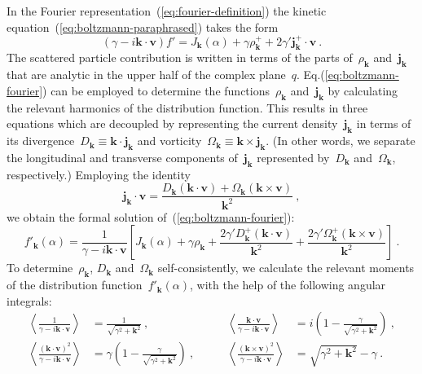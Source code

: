 \documentclass[preprint,aps,eqsecnum, prb]{revtex4-1}
\newcommand{\fplus}[1]{{#1}^{+}}
\begin{document}
In the Fourier representation~(\ref{eq:fourier-definition}) the kinetic
equation~(\ref{eq:boltzmann-paraphrased}) takes the form
\begin{equation}
  \label{eq:boltzmann-fourier}
  (\gamma - i {\bm k} \cdot {\bm v}) f' = J_{\bm k}(\alpha)
    +   \gamma \fplus{\rho}_{\bm k}
    + 2 \gamma' \fplus{\bm j}_{\bm k} \cdot {\bm v}
\ .
\end{equation}
The scattered particle contribution is written in terms of
the parts of~$\rho_{\bm k}$ and~${\bm j}_{\bm k}$ that are analytic in the
upper half of the complex plane~$q$. Eq.(\ref{eq:boltzmann-fourier})
can be employed to determine
the functions~$\rho_{\bm k}$ and~${\bm j}_{\bm k}$ by calculating the
relevant harmonics of the distribution function. This results in three
equations which are decoupled by representing the
current density~${\bm j}_{\bm k}$ in terms of its
divergence~$D_{\bm k} \equiv {\bm k}\cdot{\bm j}_{\bm k}$
and vorticity~$\Omega_{\bm k} \equiv {\bm k} \times {\bm j}_{\bm k}$.
(In other words, we separate the longitudinal and transverse
components of~${\bm j}_{\bm k}$ represented by~$D_{\bm k}$
and~$\Omega_{\bm k}$, respectively.)
Employing the identity
\begin{equation}
  \label{eq:current-identity}
  {\bm j}_{\bm k} \cdot {\bm v} = \frac{D_{\bm k} ({\bm k} \cdot {\bm v})
    + \Omega_{\bm k} ({\bm k} \times {\bm v}) }{{\bm k}^2}
\ ,
\end{equation}
we obtain the formal solution of~(\ref{eq:boltzmann-fourier}):
\begin{equation}
  f'_{\bm k}(\alpha) = \frac{1}{\gamma - i {\bm k} \cdot{\bm v}}
  \left[ J_{\bm k}(\alpha) + \gamma\rho_{\bm k}
+   \frac{2 \gamma' \fplus{D}_{\bm k} ({\bm k} \cdot {\bm v})}{{\bm k}^2}
+  \frac{2 \gamma' \fplus{\Omega}_{\bm k} ({\bm k} \times {\bm v})}{{\bm k}^2}
  \right]
  \ .
\end{equation}
To determine~$\rho_{\bm k}$, $D_{\bm k}$ and~$\Omega_{\bm k}$
self-consistently, we calculate the relevant moments of the distribution
function~$f'_{\bm k}(\alpha)$, with the help of
 the following angular integrals:
\begin{align}
  \label{eq:angular-integrals}
  \left\langle
      \frac{1}{\gamma -i {\bm k} \cdot {\bm v}}
  \right\rangle
  &= \frac{1}{\sqrt{\gamma^2 + {\bm k}^2}}
  \ , \qquad
  &\left\langle
     \frac{{\bm k}\cdot{\bm v}}{\gamma -i {\bm k} \cdot {\bm v}}
  \right\rangle
  &= i \left(1 - \frac{\gamma}{\sqrt{\gamma^2 + {\bm k}^2}}\right)
  \ ,
\\
  \left\langle
      \frac{({\bm k}\cdot{\bm v})^2}{\gamma -i {\bm k} \cdot {\bm v}}
  \right\rangle
  &= \gamma \left(1 - \frac{\gamma}{\sqrt{\gamma^2 + {\bm k}^2}}\right) \ ,
  \qquad
  &\left\langle
     \frac{\left({\bm k}\times{\bm v}\right)^2}{\gamma -i {\bm k} \cdot {\bm v}}
  \right\rangle
  &=\sqrt{\gamma^2 + {\bm k}^2} - \gamma \ .
\nonumber
\end{align}
\end{document}
